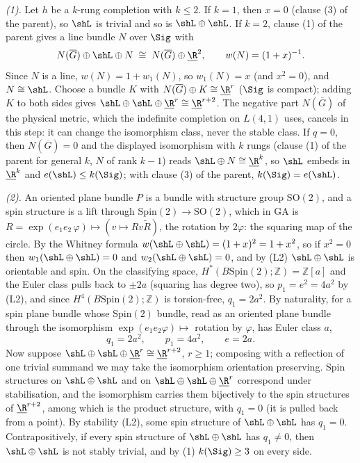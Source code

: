 \emph{(1).} Let $h$ be a $k$-rung completion with $k \le 2$. If $k = 1$, then $x = 0$ (clause (3) of the parent), so $\shL$ is trivial and so is $\shL \oplus \shL$. If $k = 2$, clause (1) of the parent gives a line bundle $N$ over $\Sig$ with
\[
N(\overline G) \oplus \shL \oplus N \;\cong\; N(\overline G) \oplus \underline{\R}^{2}, \qquad w(N) = (1 + x)^{-1}.
\]
Since $N$ is a line, $w(N) = 1 + w_{1}(N)$, so $w_{1}(N) = x$ (and $x^{2} = 0$), and $N \cong \shL$. Choose a bundle $K$ with $N(\overline G) \oplus K \cong \underline{\R}^{r}$ ($\Sig$ is compact); adding $K$ to both sides gives $\shL \oplus \shL \oplus \underline{\R}^{r} \cong \underline{\R}^{r+2}$. The negative part $N(\overline G)$ of the physical metric, which the indefinite completion on $L(4,1)$ uses, cancels in this step: it can change the isomorphism class, never the stable class. If $q = 0$, then $N(\overline G) = 0$ and the displayed isomorphism with $k$ rungs (clause (1) of the parent for general $k$, $N$ of rank $k - 1$) reads $\shL \oplus N \cong \underline{\R}^{k}$, so $\shL$ embeds in $\underline{\R}^{k}$ and $e(\shL) \le k(\Sig)$; with clause (3) of the parent, $k(\Sig) = e(\shL)$.

\emph{(2).} An oriented plane bundle $P$ is a bundle with structure group $\mathrm{SO}(2)$, and a spin structure is a lift through $\mathrm{Spin}(2) \to \mathrm{SO}(2)$, which in GA is $R = \exp(e_{1}e_{2}\,\varphi) \mapsto (v \mapsto R v \tilde R)$, the rotation by $2\varphi$: the squaring map of the circle. By the Whitney formula $w(\shL \oplus \shL) = (1 + x)^{2} = 1 + x^{2}$, so if $x^{2} = 0$ then $w_{1}(\shL \oplus \shL) = 0$ and $w_{2}(\shL \oplus \shL) = 0$, and by (L2) $\shL \oplus \shL$ is orientable and spin. On the classifying space, $H^{*}(B\mathrm{Spin}(2); \mathbb{Z}) = \mathbb{Z}[a]$ and the Euler class pulls back to $\pm 2a$ (squaring has degree two), so $p_{1} = e^{2} = 4a^{2}$ by (L2), and since $H^{4}(B\mathrm{Spin}(2); \mathbb{Z})$ is torsion-free, $q_{1} = 2a^{2}$. By naturality, for a spin plane bundle whose $\mathrm{Spin}(2)$ bundle, read as an oriented plane bundle through the isomorphism $\exp(e_{1}e_{2}\varphi) \mapsto$ rotation by $\varphi$, has Euler class $a$,
\[
q_{1} = 2a^{2}, \qquad p_{1} = 4a^{2}, \qquad e = 2a .
\]
Now suppose $\shL \oplus \shL \oplus \underline{\R}^{r} \cong \underline{\R}^{r+2}$, $r \geq 1$; composing with a reflection of one trivial summand we may take the isomorphism orientation preserving. Spin structures on $\shL \oplus \shL$ and on $\shL \oplus \shL \oplus \underline{\R}^{r}$ correspond under stabilisation, and the isomorphism carries them bijectively to the spin structures of $\underline{\R}^{r+2}$, among which is the product structure, with $q_{1} = 0$ (it is pulled back from a point). By stability (L2), some spin structure of $\shL \oplus \shL$ has $q_{1} = 0$. Contrapositively, if every spin structure of $\shL \oplus \shL$ has $q_{1} \neq 0$, then $\shL \oplus \shL$ is not stably trivial, and by (1) $k(\Sig) \geq 3$ on every side.

